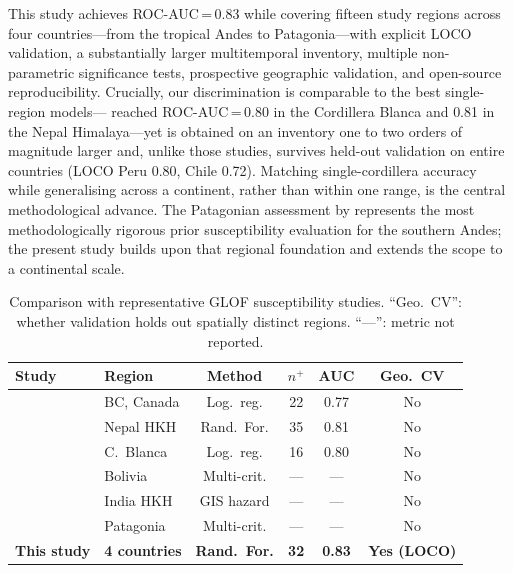 \documentclass[pdflatex,sn-basic]{sn-jnl}%
\begin{document}
This study achieves ROC-AUC\,=\,0.83 while covering fifteen study regions
across four countries---from the tropical Andes to Patagonia---with
explicit LOCO validation, a substantially larger multitemporal inventory,
multiple non-parametric significance tests, prospective geographic
validation, and open-source reproducibility. Crucially, our discrimination
is comparable to the best single-region models---\citet{Emmer2020} reached
ROC-AUC\,=\,0.80 in the Cordillera Blanca and \citet{Rounce2017} 0.81 in
the Nepal Himalaya---yet is obtained on an inventory one to two orders of
magnitude larger and, unlike those studies, survives held-out validation on
entire countries (LOCO Peru 0.80, Chile 0.72). Matching single-cordillera
accuracy while generalising across a continent, rather than within one
range, is the central methodological advance.
The Patagonian assessment by \citet{IribarrenAnacona2014} represents the most methodologically
rigorous prior susceptibility evaluation for the southern Andes; the
present study builds upon that regional foundation and extends the
scope to a continental scale.

\begin{table}[!t]
\caption{Comparison with representative GLOF susceptibility studies.
  ``Geo.~CV'': whether validation holds out spatially distinct
  regions. ``---'': metric not reported.}
\label{tab:lit_comparison}
\centering
\begin{tabular*}{\textwidth}{@{\extracolsep{\fill}}llcccc}
\toprule
\textbf{Study} & \textbf{Region} & \textbf{Method} & \textbf{$n^+$}
  & \textbf{AUC} & \textbf{Geo.~CV} \\
\midrule
\citep{McKillop2007}
  & BC, Canada  & Log.\ reg.  & 22 & 0.77 & No \\
\citep{Rounce2017}
  & Nepal HKH   & Rand.\ For. & 35 & 0.81 & No \\
\citep{Emmer2020}
  & C.\ Blanca  & Log.\ reg.  & 16 & 0.80 & No \\
\citep{Cook2016}
  & Bolivia     & Multi-crit. & --- & --- & No \\
\citep{Allen2016}
  & India HKH   & GIS hazard  & --- & --- & No \\
\citep{IribarrenAnacona2014}
  & Patagonia   & Multi-crit. & --- & --- & No \\
\textbf{This study}
  & \textbf{4 countries} & \textbf{Rand.\ For.}
  & \textbf{32} & \textbf{0.83} & \textbf{Yes (LOCO)} \\
\bottomrule
\end{tabular*}
\end{table}
\end{document}
